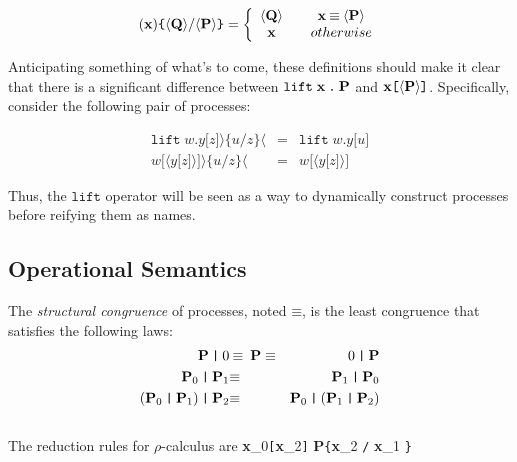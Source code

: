 \documentclass{amsart}
\newcommand{\id}[1]{\texttt{#1}}
\newcommand{\juxtap}{\mathbin{\id{|}}}
\newcommand{\concat}{\mathbin{\id{.}}}
\newcommand{\scong}{\mathbin{\equiv}}
\newcommand{\pzero}{\mathbin{0}}
\newcommand{\category}[1]{\mbox{\bf #1}}
\theoremstyle{definition}
\theoremstyle{remark}
\numberwithin{equation}{subsection}
\newcommand{\lpquote}{\langle}
\newcommand{\rpquote}{\rangle}
\begin{document}
\begin{equation*}
(\category{x})\id{\{} \lpquote \category{Q} \rpquote / \lpquote \category{P} \rpquote \id{\}}            = 
		\left\{ 
			\begin{array}{ccc}
				\lpquote \category{Q} \rpquote & & \category{x} \scong \lpquote \category{P} \rpquote \\
                                \category{x} & & otherwise \\
			\end{array}
		\right.
\end{equation*}

Anticipating something of what's to come, these definitions should
make it clear that there is a significant difference between
$\id{lift} \; \category{x} \concat \category{P}$ and
$\category{x}\id{[}\lpquote\category{P}\rpquote\id{]}$. Specifically, consider the following pair of processes:

\begin{eqnarray*}
	\id{lift} \; w \concat y \id{[}z\id{]} \rpquote \id{\{}u / z \id{\}} \lpquote
		& = &
		\id{lift} \; w \concat y \id{[}u\id{]} \\
	w\id{[} \lpquote y\id{[}z\id{]} \rpquote \id{]} \rpquote \id{\{}u / z \id{\}} \lpquote
		& = &
		w\id{[} \lpquote y\id{[}z\id{]} \rpquote \id{]}
\end{eqnarray*}

Thus, the $\id{lift}$ operator will be seen as a way to dynamically
construct processes before reifying them as names.

\subsection{Operational Semantics}
The {\em structural congruence} of processes, noted $\scong$, is the least congruence that satisfies the following laws:
\begin{eqnarray*}
\category{P} \juxtap \pzero	&  \scong \; \category{P} \; \scong & \pzero \juxtap \category{P} \\
\category{P}_0 \juxtap \category{P}_1	& \scong & \category{P}_1 \juxtap \category{P}_0 \\
(\category{P}_0 \juxtap \category{P}_1) \juxtap \category{P}_2	& \scong & \category{P}_0 \juxtap (\category{P}_1 \juxtap \category{P}_2) \\
\end{eqnarray*}
\\
The reduction rules for $\rho$-calculus are
\infrule[Comm]
{  }
{{{\category{x}_{0}\id{[}\category{x}_{2}\id{]}}} \juxtap {\category{x}_{0}\id{(}\category{x}_{1}\id{)} \concat \category{P}}
\longrightarrow \category{P}\id{\{}\category{x}_{2} \id{/} \category{x}_{1} \id{\}}}
\end{document}
